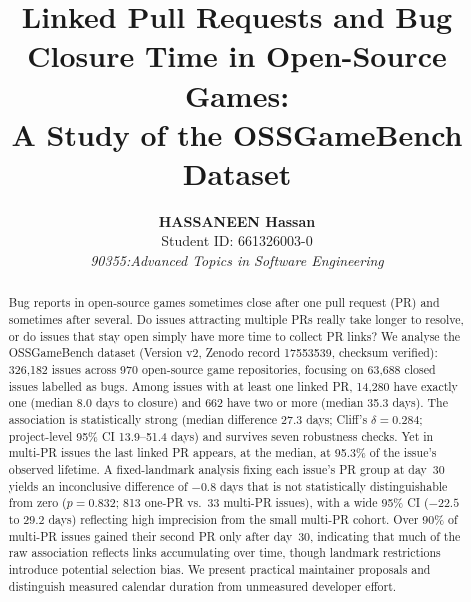 \documentclass[10pt,a4paper]{article}
\title{\bfseries Linked Pull Requests and Bug Closure Time in Open-Source Games:\\ A Study of the OSSGameBench Dataset}
\author{\textbf{HASSANEEN Hassan} \\ Student ID: 661326003-0 \\ \textit{90355:Advanced Topics in Software Engineering}}
\date{}
\begin{document}
\maketitle
\begin{abstract}
\noindent
Bug reports in open-source games sometimes close after one pull request (PR) and sometimes after several. Do issues attracting multiple PRs really take longer to resolve, or do issues that stay open simply have more time to collect PR links? We analyse the OSSGameBench dataset (Version v2, Zenodo record 17553539, checksum verified): 326,182 issues across 970 open-source game repositories, focusing on 63,688 closed issues labelled as bugs. Among issues with at least one linked PR, 14,280 have exactly one (median 8.0 days to closure) and 662 have two or more (median 35.3 days). The association is statistically strong (median difference 27.3 days; Cliff's $\delta=0.284$; project-level 95\% CI 13.9--51.4 days) and survives seven robustness checks. Yet in multi-PR issues the last linked PR appears, at the median, at 95.3\% of the issue's observed lifetime. A fixed-landmark analysis fixing each issue's PR group at day~30 yields an inconclusive difference of $-0.8$ days that is not statistically distinguishable from zero ($p=0.832$; 813 one-PR vs.\ 33 multi-PR issues), with a wide 95\% CI ($-22.5$ to $29.2$ days) reflecting high imprecision from the small multi-PR cohort. Over 90\% of multi-PR issues gained their second PR only after day~30, indicating that much of the raw association reflects links accumulating over time, though landmark restrictions introduce potential selection bias. We present practical maintainer proposals and distinguish measured calendar duration from unmeasured developer effort.
\end{abstract}














\appendix


\end{document}
